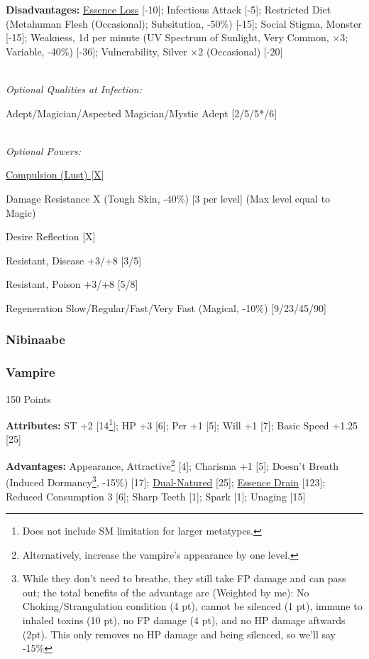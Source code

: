 \begin{multicols*}{3}
	\textbf{Disadvantages:}	
	\hyperref[essence_loss]{Essence Loss} [-10]; Infectious Attack [-5]; Restricted Diet (Metahuman Flesh (Occasional); Subsitution, -50\%) [-15]; Social Stigma, Monster [-15]; Weakness, 1d per minute (UV Spectrum of Sunlight, Very Common, $\times$3; Variable, -40\%) [-36]; Vulnerability, Silver $\times$2 (Occasional) [-20]
	
	\textit{\\Optional Qualities at Infection:}
	
	Adept/Magician/Aspected Magician/Mystic Adept [2/5/5*/6]
	
	\textit{\\Optional Powers:}
	
	\hyperref[compulsion]{Compulsion (Lust) [X]}
	
	Damage Resistance X (Tough Skin, -40\%) [3 per level] (Max level equal to Magic)
	
	Desire Reflection [X]
	
	Resistant, Disease +3/+8 [3/5]
	
	Resistant, Poison +3/+8 [5/8]	
	
	Regeneration Slow/Regular/Fast/Very Fast (Magical, -10\%) [9/23/45/90]
	
	\subsubsection{Nibinaabe}\label{nibinaabe}
	
	\subsubsection{Vampire}\label{vampire}
	\begin{flushright}
		150 Points
	\end{flushright}
	
	\textbf{Attributes:}
	ST +2 [14\footnote{Does not include SM limitation for larger metatypes.}]; HP +3 [6]; Per +1 [5]; Will +1 [7]; Basic Speed +1.25 [25]
	
	\textbf{Advantages:}
	Appearance, Attractive\footnote{Alternatively, increase the vampire's appearance by one level.} [4]; Charisma +1 [5]; Doesn't Breath (Induced Dormancy\footnote{While they don't need to breathe, they still take FP damage and can pass out; the total benefits of the advantage are (Weighted by me): No Choking/Strangulation condition (4 pt), cannot be silenced (1 pt), immune to inhaled toxins (10 pt), no FP damage (4 pt), and no HP damage aftwards (2pt). This only removes no HP damage and being silenced, so we'll say -15\%}, -15\%) [17]; \hyperref[dual_natured]{Dual-Natured} [25];  \hyperref[essence_drain]{Essence Drain} [123]; Reduced Consumption 3 [6]; Sharp Teeth [1]; Spark [1]; Unaging [15]
		

\end{multicols*}
